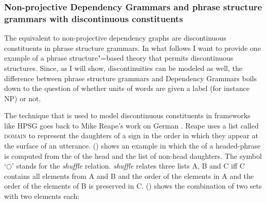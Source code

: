 \subsubsection{Non-projective Dependency Grammars and phrase structure grammars with discontinuous constituents}
\label{sec-discontinuous-constituents-HPSG}

The equivalent to non-projective dependency graphs are discontinuous constituents in phrase
structure grammars. In what follows I want to provide one
example of a phrase structure"=based theory that permits discontinuous structures. Since, as I
will show, discontinuities can be modeled as well, the difference between phrase structure grammars
and Dependency Grammars boils down to the question of whether units of words are given a label (for
instance NP) or not.

The technique that is used to model discontinuous constituents in frameworks like HPSG goes back to Mike Reape's work on German
\citeyearpar{Reape91,Reape92a,Reape94a}. 
Reape uses a list called \textsc{domain} to represent the daughters of a sign in the order in
which they appear at the surface of an utterance. () shows an example in which the \domv of a
headed-phrase is computed from the \domv of the head and the list of non-head daughters.
\ea
{} \impl
{}
\z
The symbol `$\bigcirc$'\is{$\bigcirc$}\label{rel-shuffle}
stands for the \emph{shuffle} relation. \emph{shuffle} relates three lists A, B and C iff C
contains all elements from A and B and the order of the elements in A and the order of the elements
of B is preserved in C. () shows the combination of two sets with two elements each:

